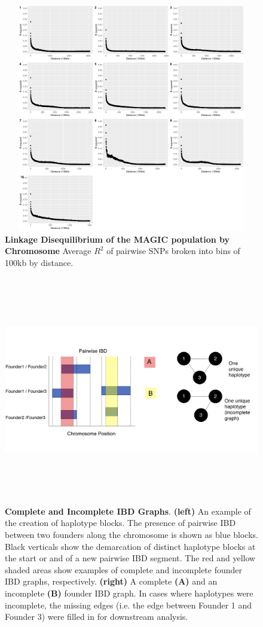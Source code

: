 \documentclass[9pt,twocolumn,twoside]{gsag3jnl}
\begin{document}
\begin{figure}[ht]
\centering
\includegraphics[width=16cm,height=10cm]{figures/all_chroms_ld_decay.png}
\caption{\textbf{Linkage Disequilibrium of the MAGIC population by Chromosome} Average $R^2$ of pairwise SNPs broken into bins of 100kb by distance.}
\label{fig:supfigure10}
\end{figure}

\begin{figure}[ht]
\centering
    \includegraphics[width=16cm,height=10cm]{figures/IBD_graph_example.png}
\caption{\textbf{Complete and Incomplete IBD Graphs}. \textbf{(left)} An example of the creation of haplotype blocks. The presence of pairwise IBD between two founders along the chromosome is shown as blue blocks. Black verticals show the demarcation of distinct haplotype blocks at the start or and of a new pairwise IBD segment. The red and yellow shaded areas show examples of complete and incomplete founder IBD graphs, respectively. \textbf{(right)} A complete \textbf{(A)} and an incomplete \textbf{(B)} founder IBD graph. In cases where haplotypes were incomplete, the missing edges (i.e. the edge between Founder 1 and Founder 3) were filled in for downstream analysis.}
\label{fig:supfigure6}
\end{figure}
\end{document}
